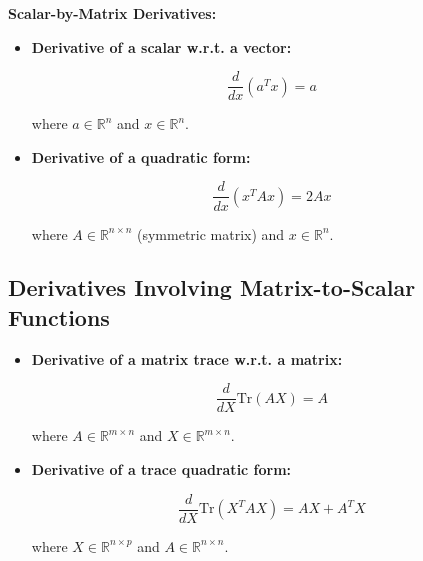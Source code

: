 \documentclass[../main.tex]{subfiles}
\begin{document}
\localtableofcontents

\textbf{Scalar-by-Matrix Derivatives:}



\begin{itemize}

    \item \textbf{Derivative of a scalar w.r.t. a vector:}

    \begin{equation}
    \frac{d}{dx} (a^T x) = a
    \end{equation}

    where $a \in \mathbb{R}^n$ and $x \in \mathbb{R}^n$.



    \item \textbf{Derivative of a quadratic form:}

    \begin{equation}
    \frac{d}{dx} (x^T A x) = 2 A x
    \end{equation}

    where $A \in \mathbb{R}^{n \times n}$ (symmetric matrix) and $x \in \mathbb{R}^n$.

\end{itemize}



\subsection{Derivatives Involving Matrix-to-Scalar Functions}



\begin{itemize}

    \item \textbf{Derivative of a matrix trace w.r.t. a matrix:}

    \begin{equation}
    \frac{d}{dX} \text{Tr}(A X) = A
    \end{equation}

    where $A \in \mathbb{R}^{m \times n}$ and $X \in \mathbb{R}^{m \times n}$.



    \item \textbf{Derivative of a trace quadratic form:}

    \begin{equation}
    \frac{d}{dX} \text{Tr}(X^T A X) = A X + A^T X
    \end{equation}

    where $X \in \mathbb{R}^{n \times p}$ and $A \in \mathbb{R}^{n \times n}$.

\end{itemize}
\end{document}
